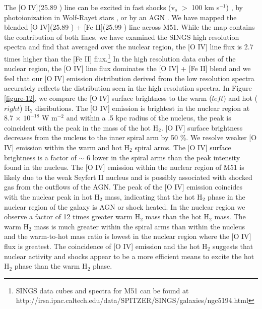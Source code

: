 \documentclass[manuscript]{aastex}
\begin{document}
The [O IV](25.89 \micron) line can be excited in fast shocks 
(v$_s$ $>$ 100 km s$^{-1}$) \citep{lutz98},
by photoionization in Wolf-Rayet stars \citep{ss99}, or by an
AGN \citep{smi04}.  We have mapped the blended 
[O IV](25.89 \micron) + [Fe II](25.99 \micron) line across M51.  
While the map contains the contribution of both lines, we have examined the SINGS 
high resolution spectra and find that averaged over the nuclear region, the [O IV] line flux is 2.7 times 
higher than the [Fe II] flux.\footnote{SINGS data cubes and spectra for M51 can be found at 
http://irsa.ipac.caltech.edu/data/SPITZER/SINGS/galaxies/ngc5194.html} 
In the high resolution data cubes of the nuclear region, 
the [O IV] line flux dominates the [O IV] + [Fe II] blend and we feel that our [O IV] 
emission distribution derived from the low resolution spectra accurately reflects 
the distribution seen in the high resolution spectra.
In Figure \ref{figure-12}, we compare 
the [O IV] surface brightness to the warm ($left$) and hot ($right$) H$_2$ disributions.  
The [O IV] emission is brightest in the nuclear region at 8.7 $\times$
$\mathrm{10^{-18}}$ W $\mathrm{m^{-2}}$ and within a .5 kpc radius of the nucleus, the peak is coincident with the peak in the mass of the hot H$_2$.  [O IV]
surface brightness decreases from the nucleus to the inner spiral arm by 50 \%.
We resolve weaker [O IV] emission within the warm and hot
H$_2$ spiral arms.  The [O IV] surface brightness
is a factor of $\sim$ 6 lower in the spiral arms than the peak
intensity found in the nucleus.  The [O IV] emission within the nuclear 
region of M51 is likely due to the weak Seyfert II nucleus \citep{ford85} 
and is possibly associated with shocked gas from the outflows of the AGN.  
The peak of the [O IV] emission coincides with the nuclear peak in hot 
H$_2$ mass, indicating that the hot H$_2$ phase in the 
nuclear region of the galaxy is AGN or shock heated. 
In the nuclear region we observe a factor of 12 times greater
warm H$_2$ mass than the hot H$_2$ mass.  
The warm H$_2$ mass is much
greater within the spiral arms than within the nucleus and the
warm-to-hot mass ratio is lowest in the nuclear region where 
the [O IV] flux is greatest.  The coincidence of [O IV] emission 
and the hot H$_2$ suggests that nuclear activity and shocks 
appear to be a more efficient means to excite the hot H$_2$ 
phase than the warm H$_2$ phase.
\end{document}
